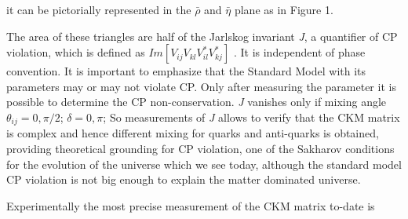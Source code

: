   it can be pictorially represented \cite{ewconstraint} in the $\bar{\rho}$ and $\bar{\eta}$ plane as in Figure 1.

The area of these triangles are half of the Jarlskog invariant \textit{J}, a quantifier of CP violation, which is defined as $ Im[V_{ij}V_{kl}V^*_{il}V^*_{kj}]$ \cite{jarsklog}. It is independent of phase convention. It is important to emphasize that the Standard Model with its parameters may or may not violate CP. Only after measuring the parameter it is possible to determine the CP non-conservation. \textit{J} vanishes\cite{secondjar} only if mixing angle $\theta_{ij} = 0 , \pi/2$; $\delta =  0 , \pi$; So measurements of \textit{J} allows to verify that the CKM matrix is complex and hence different mixing for quarks and anti-quarks is obtained, providing theoretical grounding for CP violation, one of the Sakharov conditions for the evolution of the universe which we see today, although the standard model CP violation is not big enough to explain the matter dominated universe.

Experimentally the most precise measurement of the CKM matrix\cite{ewconstraint} to-date is 


